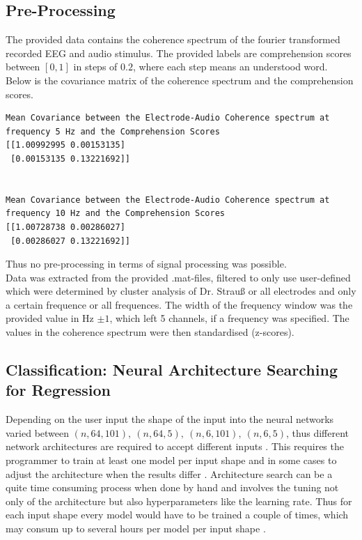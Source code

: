 \documentclass[a4paper]{report}
\begin{document}
\subsection{Pre-Processing}
The provided data contains the coherence spectrum of the fourier transformed recorded EEG and audio stimulus. The
provided labels are comprehension scores between $[0, 1]$ in steps of $0.2$, where each step means an understood word.\\
Below is the covariance matrix of the coherence spectrum and the comprehension scores.
\begin{lstlisting}
Mean Covariance between the Electrode-Audio Coherence spectrum at frequency 5 Hz and the Comprehension Scores
[[1.00992995 0.00153135]
 [0.00153135 0.13221692]]


Mean Covariance between the Electrode-Audio Coherence spectrum at frequency 10 Hz and the Comprehension Scores
[[1.00728738 0.00286027]
 [0.00286027 0.13221692]]
\end{lstlisting}
Thus no pre-processing in terms of signal processing was possible. \\
Data was extracted from the provided .mat-files, filtered to only use user-defined which were determined by cluster
analysis of Dr. Strauß or all electrodes and only a certain frequence or all frequences. The width of the frequency
window was the provided value in Hz $\pm1$, which left 5 channels, if a frequency was specified. The values in the
coherence spectrum were then standardised (z-scores).\\

\subsection{Classification: Neural Architecture Searching for Regression}
Depending on the user input the shape of the input into the neural networks varied between $(n,64,101), \ (n, 64, 5),
\ (n, 6, 101), \ (n, 6, 5)$, thus different network architectures are required to accept different inputs
\cite{tensorflow2015-whitepaper}. This requires the programmer to train at least one model per input shape and in some
cases to adjust the architecture when the results
differ \cite{pmlr-v9-glorot10a}. Architecture search can be a quite time consuming process when done by hand and involves the tuning not only of
the architecture but also hyperparameters like the learning rate. Thus for each input shape every model would have to be
trained a couple of times, which may consum up to several hours per model per input shape \cite{Bengio_2012}. \\
\end{document}
